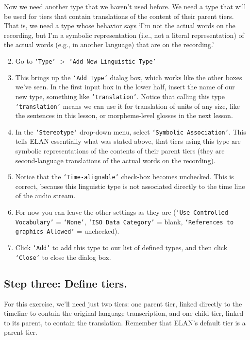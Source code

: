 \documentclass[letterpaper,12pt]{article}
\begin{document}
\noindent Now we need another type that we haven't used before. We need a type that will be used for tiers that contain translations of the content of their parent tiers. That is, we need a type whose behavior says `I'm not the actual words on the recording, but I'm a symbolic representation (i.e., not a literal representation) of the actual words (e.g., in another language) that are on the recording.'

\begin{enumerate}
\setcounter{enumi}{1}
\item Go to \texttt{`Type'} $>$ \texttt{`Add New Linguistic Type'}
\item This brings up the \texttt{`Add Type'} dialog box, which works like the other boxes we've seen. In the first input box in the lower half, insert the name of our new type, something like \texttt{`translation'}. Notice that calling this type \texttt{`translation'} means we can use it for translation of units of any size, like the sentences in this lesson, or morpheme-level glosses in the next lesson.
\item In the \texttt{`Stereotype'} drop-down menu, select \texttt{`Symbolic Association'}. This tells ELAN essentially what was stated above, that tiers using this type are symbolic representations of the contents of their parent tiers (they are second-language translations of the actual words on the recording).
\item Notice that the \texttt{`Time-alignable'} check-box becomes unchecked. This is correct, because this linguistic type is not associated directly to the time line of the audio stream.
\item For now you can leave the other settings as they are (\texttt{`Use Controlled Vocabulary'} = \texttt{`None'}, \texttt{`ISO Data Category'} = blank, \texttt{`References to graphics Allowed'} = unchecked).
\item Click \texttt{`Add'} to add this type to our list of defined types, and then click \texttt{`Close'} to close the dialog box.
\end{enumerate}

\subsection*{Step three: Define tiers.}
\noindent For this exercise, we'll need just two tiers: one parent tier, linked directly to the timeline to contain the original language transcription, and one child tier, linked to its parent, to contain the translation. Remember that ELAN's default tier is a parent tier.
\end{document}

